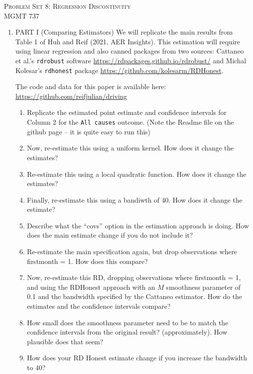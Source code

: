 \documentclass[11pt, a4paper]{article}
\begin{document}
\begin{center}
  {\Large \textsc{Problem Set 8: Regression Discontinuity}}\\
  MGMT 737
\end{center}
\begin{enumerate}
\item PART I (Comparing Estimators) We will replicate the main results
  from Table 1 of Huh and Reif (2021, AER Insights). This estimation
  will require using linear regression and also canned packages from
  two sources: Cattaneo et al.'s \texttt{rdrobust} software
  \url{https://rdpackages.github.io/rdrobust/} and Michal Kolesar's
  \texttt{rdhonest} package \url{https://github.com/kolesarm/RDHonest}.

  The code and data for this paper is available here: \url{https://github.com/reifjulian/driving}
  \begin{enumerate}
  \item Replicate the estimated point estimate and confidence
    intervals for Column 2 for the \texttt{All causes}
    outcome. (Note the Readme file on the github page -- it is quite
    easy to run this)
  \item Now, re-estimate this using a uniform kernel. How does it
    change the estimates?
  \item Re-estimate this using a local quadratic function. How does it
    change the estimates?
  \item Finally, re-estimate this using a bandiwth of 40. How does it
    change the estimate? 
  \item Describe what the ``covs'' option in the estimation approach
    is doing. How does the main estimate change if you do not include
    it?
  \item Re-estimate the main specification again, but drop
    observations where firstmonth = 1. How does this compare?
  \item Now, re-estimate this RD, dropping observations where
    firstmonth = 1, and using the RDHonest approach with an $M$
    smoothness parameter of 0.1 and the bandwidth specified by the
    Cattaneo estimator. How do the estimates and the confidence
    intervals compare?
  \item How small does the smoothness parameter need to be to match
    the confidence intervals from the original result?
    (approximately). How plausible does that seem?
  \item How does your RD Honest estimate change if you increase the
    bandwidth to 40?
  \end{enumerate}

\end{enumerate}
\end{document}
